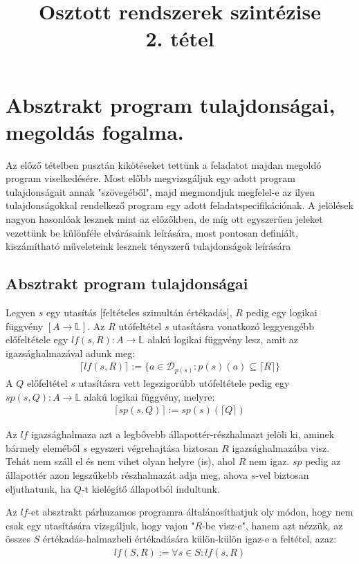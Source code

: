 \documentclass{article}
\title{Osztott rendszerek szintézise\\2. tétel}
\begin{document}
\section*{Absztrakt program tulajdonságai, megoldás fogalma.}
Az előző tételben pusztán kikötéseket tettünk a feladatot majdan megoldó program viselkedésére. Most előbb megvizsgáljuk egy adott program tulajdonságait annak "szövegéből", majd megmondjuk megfelel-e az ilyen tulajdonságokkal rendelkező program egy adott feladatspecifikációnak. A jelölések nagyon hasonlóak lesznek mint az előzőkben, de míg ott egyszerűen jeleket vezettünk be különféle elvárásaink leírására, most pontosan definiált, kiszámítható műveleteink lesznek tényszerű tulajdonságok leírására
\subsection*{Absztrakt program tulajdonságai}
Legyen $s$ egy utasítás [feltételes szimultán értékadás], $R$ pedig egy logikai függvény $[A \rightarrow \mathbb{L}]$. Az $R$ utófeltétel $s$ utasításra vonatkozó leggyengébb előfeltétele egy $lf(s,R) : A \rightarrow \mathbb{L}$ alakú logikai függvény lesz, amit az igazsághalmazával adunk meg:
\begin{align*}
\lceil lf(s,R) \rceil := \lbrace a \in \mathcal{D}_{p(s)} : p(s)(a) \subseteq \lceil R \rceil \rbrace
\end{align*}
A $Q$ előfeltétel $s$ utasításra vett legszigorúbb utófeltétele pedig egy $sp(s,Q): A \rightarrow \mathbb{L}$ alakú logikai függvény, melyre:
\begin{align*}
\lceil sp(s,Q) \rceil := sp(s)(\lceil Q \rceil)
\end{align*}

Az $lf$ igazsághalmaza azt a legbővebb állapottér-részhalmazt jelöli ki, aminek bármely eleméből $s$ egyszeri végrehajtása biztosan $R$ igazsághalmazába visz. Tehát nem száll el és nem vihet olyan helyre (is), ahol $R$ nem igaz. $sp$ pedig az állapottér azon legszűkebb részhalmazát adja meg, ahova $s$-vel biztosan eljuthatunk, ha $Q$-t kielégítő állapotból indultunk.

Az $lf$-et absztrakt párhuzamos programra általánosíthatjuk oly módon, hogy nem csak egy utasítására vizsgáljuk, hogy vajon "$R$-be visz-e", hanem azt nézzük, az összes $S$ értékadás-halmazbeli értékadására külön-külön igaz-e a feltétel, azaz:
\begin{align*}
lf(S,R) := \forall s \in S:lf(s,R)
\end{align*}
\end{document}
